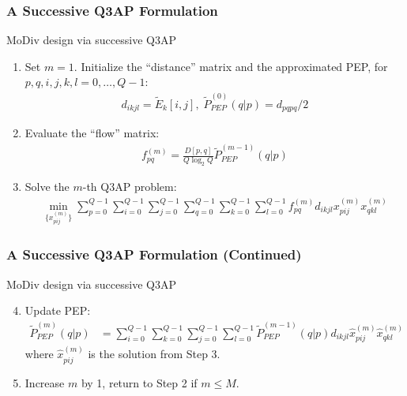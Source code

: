 \documentclass{beamer}
\begin{document}
\begin{frame}
  \frametitle{A Successive Q3AP Formulation}
  \begin{block}{MoDiv design via successive Q3AP}
    \begin{enumerate}[<+->]
      \item Set $m = 1$. Initialize the ``distance'' matrix and the approximated
      PEP, for $p, q, i, j, k, l=0,\ldots,Q-1$:
      \begin{align*}
        d_{ikjl} = \tilde{E}_k[i,j],\; \tilde{P}_{PEP}^{(0)}(q|p) = d_{pqpq}/2
      \end{align*}
      \item Evaluate the ``flow'' matrix:
      \begin{align*}
        f_{pq}^{(m)} = \frac{D[p,q]}{Q\log_2Q}\tilde{P}_{PEP}^{(m-1)}(q|p)
      \end{align*}
      \item Solve the $m$-th Q3AP problem:
      \begin{align*}
        \min_{\{x_{pij}^{(m)}\}}
        \sum_{p=0}^{Q-1}\sum_{i=0}^{Q-1}\sum_{j=0}^{Q-1}
        \sum_{q=0}^{Q-1}\sum_{k=0}^{Q-1}\sum_{l=0}^{Q-1}
        f_{pq}^{(m)}d_{ikjl}x_{pij}^{(m)}x_{qkl}^{(m)}
      \end{align*}
    \end{enumerate}
  \end{block}
\end{frame}

\begin{frame}
  \frametitle{A Successive Q3AP Formulation (Continued)}
  \begin{block}{MoDiv design via successive Q3AP}
    \begin{enumerate}[<+->]
      \setcounter{enumi}{3}
      \item Update PEP:
      \begin{align*}
        \tilde{P}_{PEP}^{(m)}(q|p) & = \sum_{i=0}^{Q-1} \sum_{k=0}^{Q-1}
        \sum_{j=0}^{Q-1} \sum_{l=0}^{Q-1}\tilde{P}_{PEP}^{(m
        - 1)}(q|p)d_{ikjl}\hat{x}_{pij}^{(m)}\hat{x}_{qkl}^{(m)}
      \end{align*}
      where $\hat{x}_{pij}^{(m)}$ is the solution from Step 3.
      \item Increase $m$ by 1, return to Step 2 if $m \leq M$.
    \end{enumerate}
  \end{block}
  \vfill
\end{frame}
\end{document}

